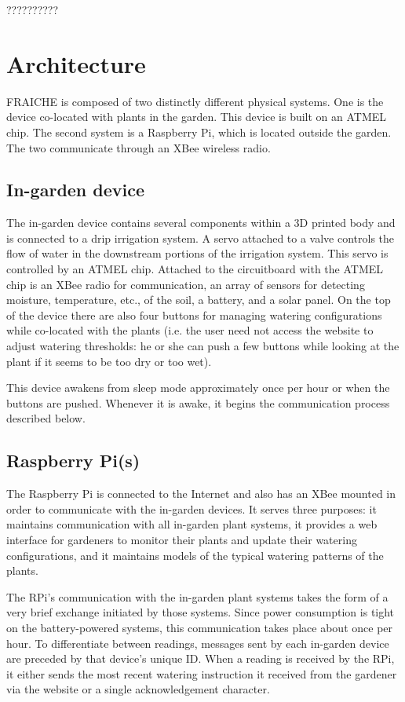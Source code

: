 \documentclass[a4paper]{acm_proc_article-sp}
\begin{document}
??????????

\section{Architecture}

FRAICHE is composed of two distinctly different physical systems.  One is the device co-located with plants in the garden.  This device is built on an ATMEL chip.  The second system is a Raspberry Pi, which is located outside the garden.  The two communicate through an XBee wireless radio.

\subsection{In-garden device}

The in-garden device contains several components within a 3D printed body and is connected to a drip irrigation system.  A servo attached to a valve controls the flow of water in the downstream portions of the irrigation system.  This servo is controlled by an ATMEL chip.  Attached to the circuitboard with the ATMEL chip is an XBee radio for communication, an array of sensors for detecting moisture, temperature, etc., of the soil, a battery, and a solar panel.  On the top of the device there are also four buttons for managing watering configurations while co-located with the plants (i.e. the user need not access the website to adjust watering thresholds: he or she can push a few buttons while looking at the plant if it seems to be too dry or too wet).

This device awakens from sleep mode approximately once per hour or when the buttons are pushed.  Whenever it is awake, it begins the communication process described below.

\subsection{Raspberry Pi(s)}

The Raspberry Pi is connected to the Internet and also has an XBee mounted in order to communicate with the in-garden devices.  It serves three purposes: it maintains communication with all in-garden plant systems, it provides a web interface for gardeners to monitor their plants and update their watering configurations, and it maintains models of the typical watering patterns of the plants.

The RPi's communication with the in-garden plant systems takes the form of a very brief exchange initiated by those systems.  Since power consumption is tight on the battery-powered systems, this communication takes place about once per hour.  To differentiate between readings, messages sent by each in-garden device are preceded by that device's unique ID.  When a reading is received by the RPi, it either sends the most recent watering instruction it received from the gardener via the website or a single acknowledgement character.
\end{document}

